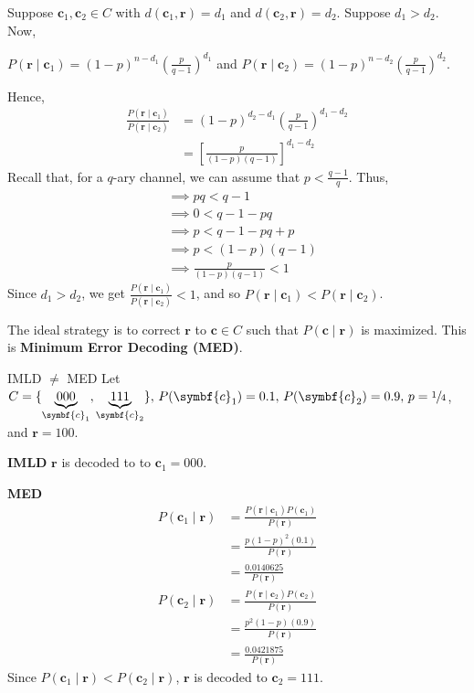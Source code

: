 \begin{Proof}{}{}
    Suppose $ \symbf{c}_1,\symbf{c}_2\in C $ with $ d(\symbf{c}_1,\symbf{r})=d_1 $
    and $ d(\symbf{c}_2,\symbf{r})=d_2 $.
    Suppose $ d_1>d_2 $. Now,

    $ P(\symbf{r}\mid \symbf{c}_1)=(1-p)^{n-d_1}\left( \frac{p}{q-1} \right)^{d_1} $ and
    $ P(\symbf{r}\mid \symbf{c}_2)=(1-p)^{n-d_2}\left( \frac{p}{q-1} \right)^{d_2} $.

    Hence,
    \begin{align*}
        \frac{P(\symbf{r}\mid \symbf{c}_1)}{P(\symbf{r}\mid \symbf{c}_2)}
         & =(1-p)^{d_2-d_1}\left( \frac{p}{q-1}  \right)^{d_1-d_2} \\
         & =\left[ \frac{p}{(1-p)(q-1)}  \right]^{d_1-d_2}
    \end{align*}
    Recall that, for a $ q $-ary channel, we can assume that $ p<\frac{q-1}{q} $. Thus,
    \begin{align*}
         & \implies pq < q-1                 \\
         & \implies 0 < q-1-pq               \\
         & \implies p < q-1-pq+p             \\
         & \implies p < (1-p)(q-1)           \\
         & \implies \frac{p}{(1-p)(q-1)} < 1
    \end{align*}
    Since $ d_1>d_2 $, we get $ \frac{P(\symbf{r}\mid \symbf{c}_1)}{P(\symbf{r}\mid \symbf{c}_2)} < 1 $, and so
    $ P(\symbf{r}\mid \symbf{c}_1)<P(\symbf{r}\mid \symbf{c}_2) $.
\end{Proof}
The ideal strategy is to correct $ \symbf{r} $ to $ \symbf{c}\in C $ such that
$ P(\symbf{c}\mid \symbf{r}) $ is maximized. This is \textbf{Minimum Error Decoding (MED)}.


\begin{Example}{IMLD $ \neq $ MED}{}
    Let $ C=\set{\underbrace{000}_{\symbf{c}_1},\underbrace{111}_{\symbf{c}_2}},\,
        P(\symbf{c}_1)=0.1,\, P(\symbf{c}_2)=0.9,\, p=\sfrac{1}{4} $, and $ \symbf{r}=100 $.

    \textbf{IMLD} $ \symbf{r} $ is decoded to to $ \symbf{c}_1 = 000 $.

    \textbf{MED}
    \begin{align*}
        P(\symbf{c}_1\mid \symbf{r})
         & =\frac{P(\symbf{r}\mid \symbf{c}_1)P(\symbf{c}_1)}{P(\symbf{r})} \\
         & =\frac{p(1-p)^2(0.1)}{P(\symbf{r})}                     \\
         & =\frac{0.0140625}{P(\symbf{r})}
    \end{align*}
    \begin{align*}
        P(\symbf{c}_2\mid \symbf{r})
         & =\frac{P(\symbf{r}\mid \symbf{c}_2)P(\symbf{c}_2)}{P(\symbf{r})} \\
         & =\frac{p^2(1-p)(0.9)}{P(\symbf{r})}                     \\
         & =\frac{0.0421875}{P(\symbf{r})}
    \end{align*}
    Since $ P(\symbf{c}_1\mid \symbf{r})<P(\symbf{c}_2\mid \symbf{r}) $,
    $ \symbf{r} $ is decoded to $ \symbf{c}_2=111 $.
\end{Example}


